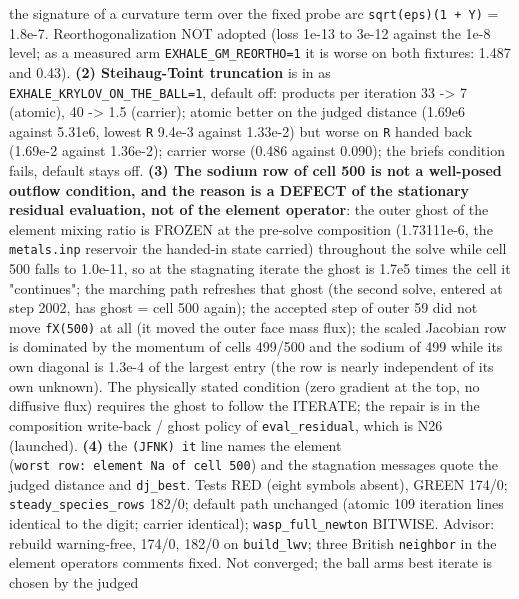 \documentclass[english,a4paper]{my_memo}
\begin{document}
\begin{itemize}
  the signature of a curvature term over the fixed probe arc \texttt{sqrt(eps)(1\ +\ \textbar{}\textbar{}Y\textbar{}\textbar{})} = 1.8e-7. Reorthogonalization NOT adopted (loss 1e-13 to 3e-12
  against the 1e-8 level; as a measured arm \texttt{EXHALE\_GM\_REORTHO=1} it is
  worse on both fixtures: 1.487 and 0.43). \textbf{(2) Steihaug-Toint truncation}
  is in as \texttt{EXHALE\_KRYLOV\_ON\_THE\_BALL=1}, default off: products per
  iteration 33 -\textgreater{} 7 (atomic), 40 -\textgreater{} 1.5 (carrier); atomic better on the
  judged distance (1.69e6 against 5.31e6, lowest \texttt{\textbar{}\textbar{}R\textbar{}\textbar{}} 9.4e-3 against
  1.33e-2) but worse on \texttt{\textbar{}\textbar{}R\textbar{}\textbar{}} handed back (1.69e-2 against 1.36e-2);
  carrier worse (0.486 against 0.090); the brief\textquotesingle s condition fails, default
  stays off. \textbf{(3) The sodium row of cell 500 is not a well-posed outflow
  condition, and the reason is a DEFECT of the stationary residual
  evaluation, not of the element operator}: the outer ghost of the element
  mixing ratio is FROZEN at the pre-solve composition (1.73111e-6, the
  \texttt{metals.inp} reservoir the handed-in state carried) throughout the solve
  while cell 500 falls to 1.0e-11, so at the stagnating iterate the ghost is
  1.7e5 times the cell it "continues"; the marching path refreshes that
  ghost (the second solve, entered at step 2002, has ghost = cell 500
  again); the accepted step of outer 59 did not move \texttt{fX(500)} at all (it
  moved the outer face mass flux); the scaled Jacobian row is dominated by
  the momentum of cells 499/500 and the sodium of 499 while its own
  diagonal is 1.3e-4 of the largest entry (the row is nearly independent
  of its own unknown). The physically stated condition (zero gradient at
  the top, no diffusive flux) requires the ghost to follow the ITERATE;
  the repair is in the composition write-back / ghost policy of
  \texttt{eval\_residual}, which is N26 (launched). \textbf{(4)} the \texttt{(JFNK)\ it} line
  names the element (\texttt{worst\ row:\ element\ Na\ of\ cell\ 500}) and the stagnation
  messages quote the judged distance and \texttt{dj\_best}. Tests RED (eight symbols
  absent), GREEN 174/0; \texttt{steady\_species\_rows} 182/0; default path unchanged
  (atomic 109 iteration lines identical to the digit; carrier identical);
  \texttt{wasp\_full\_newton} BITWISE. Advisor: rebuild warning-free, 174/0, 182/0 on
  \texttt{build\_lwv}; three British \texttt{neighbor} in the element operator\textquotesingle s comments
  fixed. Not converged; the ball arm\textquotesingle s best iterate is chosen by the judged

\end{itemize}
\end{document}
